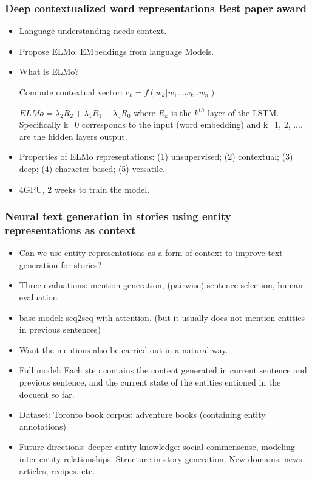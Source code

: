\subsubsection{Deep contextualized word representations {\color{blue}Best paper award}}
\begin{itemize}
	\item Language understanding needs context.
	\item Propose ELMo: EMbeddings from language Models. 
	\item What is ELMo?
	
	Compute contextual vector: $c_k = f(w_k | w_1 ... w_k .. w_n)$
	
	$ELMo = \lambda_2 R_2 + \lambda_1 R_1 + \lambda_0 R_0$ where $R_k$ is the $k^{th}$ layer of the LSTM. Specifically k=0 corresponds to the input (word embedding) and k=1, 2, .... are the hidden layers output.
	
	\item Properties of ELMo representations: (1) unsupervised; (2) contextual; (3) deep; (4) character-based; (5) versatile.
	
	\item 4GPU, 2 weeks to train the model.
\end{itemize}


\subsubsection{Neural text generation in stories using entity representations as context }
\begin{itemize}
	\item Can we use entity representations as a form of context to improve text generation for stories?
	\item Three evaluations: mention generation, (pairwise) sentence selection, human evaluation
	\item base model: seq2seq with attention. (but it usually does not mention entities in previous sentences)
	
	\item Want the mentions also be carried out in a natural way.
	
	\item Full model: Each step contains the content generated in current sentence and previous sentence, and the current state of the entities entioned in the docuent so far.
	
	\item Dataset: Toronto book corpus: adventure books (containing entity annotations)
	
	\item Future directions: deeper entity knowledge: social commensense, modeling inter-entity relationships. Structure in story generation. New domains: news articles, recipes. etc.
\end{itemize}

